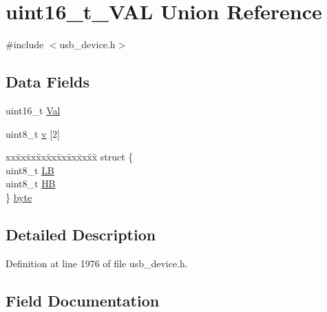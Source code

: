 \hypertarget{unionuint16__t___v_a_l}{}\section{uint16\+\_\+t\+\_\+\+V\+AL Union Reference}
\label{unionuint16__t___v_a_l}


{\ttfamily \#include $<$usb\+\_\+device.\+h$>$}

\subsection*{Data Fields}
\begin{DoxyCompactItemize}
\item 
uint16\+\_\+t \mbox{\hyperlink{unionuint16__t___v_a_l_ac5c61e3f936b9c3554b06beb5961c12e}{Val}}
\item 
uint8\+\_\+t \mbox{\hyperlink{unionuint16__t___v_a_l_a81a08957904c562944b33d7d2ae4f42d}{v}} \mbox{[}2\mbox{]}
\item 
\begin{tabbing}
xx\=xx\=xx\=xx\=xx\=xx\=xx\=xx\=xx\=\kill
struct \{\\
\>uint8\_t \mbox{\hyperlink{unionuint16__t___v_a_l_aecc66fcbbc95a34cfd23bddac11a425d}{LB}}\\
\>uint8\_t \mbox{\hyperlink{unionuint16__t___v_a_l_ad741fe9900e35379cedd1deefa7ba84f}{HB}}\\
\} \mbox{\hyperlink{unionuint16__t___v_a_l_a6a869701ef67b021c29485888e92aeb9}{byte}}\\

\end{tabbing}\end{DoxyCompactItemize}


\subsection{Detailed Description}


Definition at line 1976 of file usb\+\_\+device.\+h.



\subsection{Field Documentation}
\mbox{\label{unionuint16__t___v_a_l_a6a869701ef67b021c29485888e92aeb9}} 
